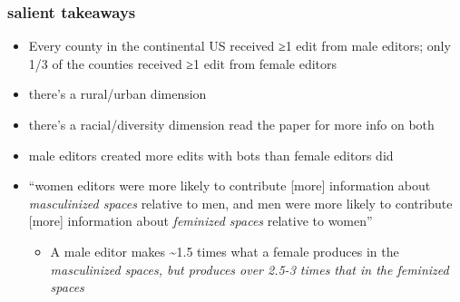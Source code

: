 \documentclass[presentation]{subfiles}
\begin{document}
\begin{frame}\frametitle{salient takeaways}

\begin{itemize}
  \item Every county in the continental US received ≥1 edit from male editors; only 1/3 of the counties received ≥1 edit from female editors
  \item {there's a {rural/urban dimension} } %

  \item {there's a {racial/diversity dimension} } \hfill {\scriptsize read the paper for more info on both}


  \item male editors created more edits with bots than female editors did

  \item ``\alert<1>{women editors were more likely to contribute [more] information about \em{masculinized spaces}} relative to men, and \alert<2>{men were more likely to contribute [more] information about \em{feminized spaces}} relative to women''
  
  \begin{itemize}
    \item A male editor makes \textasciitilde1.5 times what a female produces in the \em{masculinized spaces}, but produces over 2.5-3 times that in the \em{feminized spaces}
  \end{itemize}


\end{itemize}

\end{frame}
\end{document}
